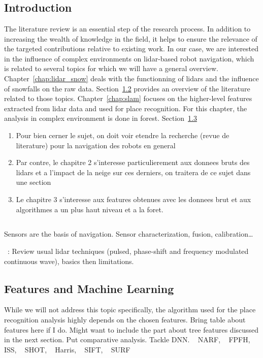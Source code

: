 \chapter{\chapzerotitle}
\label{chap:literature_review}


\section{Introduction}
The literature review is an essential step of the research process. In addition to increasing the wealth of knowledge in the field, it helps to ensure the relevance of the targeted contributions relative to existing work. In our case, we are interested in the influence of complex environments on \gls*{lidar}-based robot navigation, which is related to several topics for which we will have a general overview. Chapter~\ref{chap:lidar_snow} deals with the functionning of \gls*{lidar}s and the influence of snowfalls on the raw data. Section~\ref{sec:literature_snow} provides an overview of the literature related to those topics. Chapter~\ref{chap:slam} focuses on the higher-level features extracted from \gls*{lidar} data and used for place recognition. For this chapter, the analysis in complex environment is done in forest. Section~\ref{sec:literature_slam} 

\begin{enumerate}
    \item Pour bien cerner le sujet, on doit voir etendre la recherche (revue de literature) pour la navigation des robots en general
    \item Par contre, le chapitre 2 s'interesse particulierement aux donnees bruts des lidars et a l'impact de la neige sur ces derniers, on traitera de ce sujet dans une section
    \item Le chapitre 3 s'interesse aux features obtenues avec les donnees brut et aux algorithmes a un plus haut niveau et a la foret. 
\end{enumerate}


\section{\chaplidartitle}
\label{sec:literature_snow}
Sensors are the basis of navigation. Sensor characterization, fusion, calibration\dots

~\cite{Bosch2001}:
Review usual lidar techniques (pulsed, phase-shift and frequency modulated continuous wave), basics then limitations.


\section{Features and Machine Learning}
\label{sec:literature_slam}
While we will not address this topic specifically, the algorithm used for the place recognition analysis highly depends on the chosen features.  
Bring table about features here if I do. Might want to include the part about tree features discussed in the next section. Put comparative analysis. Tackle DNN.
~\cite{Steder2011a} NARF, ~\cite{Rusu2009} FPFH, ~\cite{Yu2009} ISS, ~\cite{Tombari2010} SHOT, ~\cite{Harris1988} Harris, ~\cite{Lowe2004} SIFT, ~\cite{Bay2006} SURF

